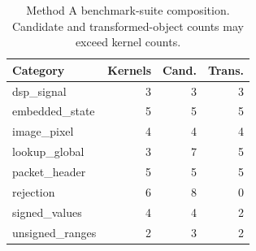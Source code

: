 \begin{table}[t]
\centering
\caption{Method A benchmark-suite composition. Candidate and transformed-object counts may exceed kernel counts.}
\label{tab:categories}
\small
\begin{tabular}{lrrr}
\toprule
Category & Kernels & Cand. & Trans. \\
\midrule
dsp\_signal & 3 & 3 & 3 \\
embedded\_state & 5 & 5 & 5 \\
image\_pixel & 4 & 4 & 4 \\
lookup\_global & 3 & 7 & 5 \\
packet\_header & 5 & 5 & 5 \\
rejection & 6 & 8 & 0 \\
signed\_values & 4 & 4 & 2 \\
unsigned\_ranges & 2 & 3 & 2 \\
\bottomrule
\end{tabular}
\end{table}
